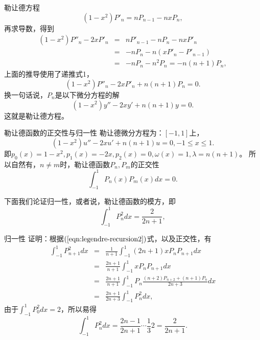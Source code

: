 \documentclass[11pt]{beamer}
\begin{document}
\begin{frame}{勒让德方程}
\begin{equation}
(1-x^2)P'_n = nP_{n-1} - nxP_n,
\end{equation}
再求导数，得到
\begin{eqnarray}
(1-x^2)P''_n - 2xP'_n &=& nP'_{n-1} - nP_n - nxP'_n \nonumber\\
&=& -n P_n - n( xP'_n - P'_{n-1} ) \nonumber\\
&=& -nP_n - n^2 P_n = -n(n+1)P_n,
\end{eqnarray}
上面的推导使用了递推式1，
\begin{equation}
(1-x^2)P''_n - 2xP'_n + n(n+1)P_n = 0.
\end{equation}
换一句话说，$P_n$是以下微分方程的解
\begin{equation}
(1-x^2)y'' - 2x y' + n(n+1) y = 0.
\end{equation}
这就是勒让德方程。
\end{frame}

\begin{frame}{勒让德函数的正交性与归一性}
勒让德微分方程为：$[-1,1]$上，
\begin{equation}
(1-x^2) u'' - 2x u' + n(n+1) u = 0, -1 \leq x \leq 1.
\end{equation}
即$p_0 (x) = 1-x^2, p_1(x) = -2x, p_2(x) = 0, \omega(x) = 1, \lambda = n(n+1)$。
所以自然有，$n\neq m$时，勒让德函数$P_n, P_m$的正交性
\begin{equation}
\int^1_{-1} P_n(x) P_m(x) dx = 0.
\end{equation}

下面我们论证归一性，或者说，勒让德函数的模方，即
\begin{equation}
\int^1_{-1} P^2_n dx = \frac{2}{2n+1},
\end{equation}
\end{frame}

\begin{frame}{归一性}
证明：根据$(\ref{eqn:legendre-recursion2})$式，以及正交性，有
\begin{eqnarray}
\int^1_{-1} P^2_{n+1} dx &=& \frac{1}{n+1}\int^1_{-1} (2n+1) x P_n P_{n+1} dx 
\nonumber\\
&=& \frac{2n+1}{n+1} \int^1_{-1} x P_n P_{n+1} dx
\nonumber\\
&=& \frac{2n+1}{n+1} \int^1_{-1} P_n \frac{(n+2)P_{n+2} + (n+1)P_n}{2n+3} dx
\nonumber\\
&=& \frac{2n+1}{2n+3} \int^1_{-1} P^2_n dx,
\end{eqnarray}
由于$\int^1_{-1} P^2_0 dx = 2$，所以易得
\begin{equation}
\int^1_{-1} P^2_n dx = \frac{2n-1}{2n+1} \cdots \frac{1}{3} 2 = \frac{2}{2n+1}.
\end{equation}
\end{frame}
\end{document}
